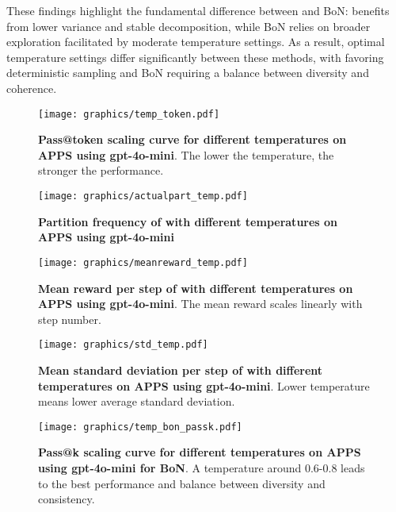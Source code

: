 These findings highlight the fundamental difference between \decomp and BoN: \decomp benefits from lower variance and stable decomposition, while BoN relies on broader exploration facilitated by moderate temperature settings. As a result, optimal temperature settings differ significantly between these methods, with \decomp favoring deterministic sampling and BoN requiring a balance between diversity and coherence.

\begin{figure}[ht]
    \centering
    \texttt{[image: graphics/temp\_token.pdf]}
    \caption{\textbf{Pass@token scaling curve for different temperatures on APPS using gpt-4o-mini}. The lower the temperature, the stronger the \decomp performance.}
    \label{fig:temp_token}
\end{figure}

\begin{figure}[ht]
    \centering
    \texttt{[image: graphics/actualpart\_temp.pdf]}
    \caption{\textbf{Partition frequency of \decomp with different temperatures on APPS using gpt-4o-mini}}
    \label{fig:temp_actualpart}
\end{figure}

\begin{figure}[ht]
    \centering
    \texttt{[image: graphics/meanreward\_temp.pdf]}
    \caption{\textbf{Mean reward per step of \decomp with different temperatures on APPS using gpt-4o-mini}. The mean reward scales linearly with step number.}
    \label{fig:temp_rewardstep}
\end{figure}

\begin{figure}[ht]
    \centering
    \texttt{[image: graphics/std\_temp.pdf]}
    \caption{\textbf{Mean standard deviation per step of \decomp with different temperatures on APPS using gpt-4o-mini}. Lower temperature means lower average standard deviation.}
    \label{fig:temp_stdstep}
\end{figure}


\begin{figure}[ht]
    \centering
    \texttt{[image: graphics/temp\_bon\_passk.pdf]}
    \caption{\textbf{Pass@k scaling curve for different temperatures on APPS using gpt-4o-mini for BoN}. A temperature around 0.6-0.8 leads to the best performance and balance between diversity and consistency.}
    \label{fig:temp_bon_passk}
\end{figure}



